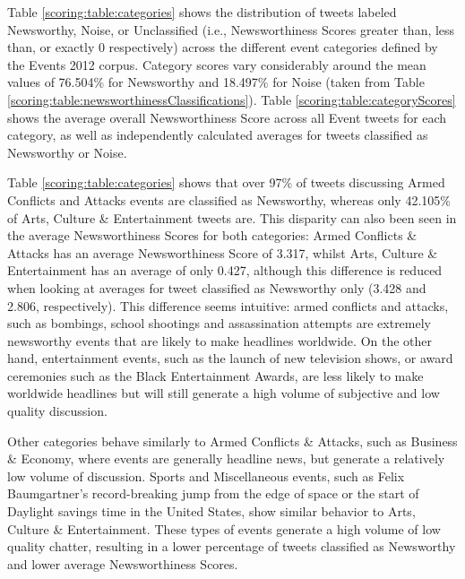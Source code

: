 Table \ref{scoring:table:categories} shows the distribution of tweets labeled Newsworthy,  Noise, or Unclassified (i.e., Newsworthiness Scores greater than, less than, or exactly 0 respectively) across the different event categories defined by the Events 2012 corpus.
Category scores vary considerably around the mean values of 76.504\% for Newsworthy and 18.497\% for Noise (taken from Table \ref{scoring:table:newsworthinessClassifications}).
Table \ref{scoring:table:categoryScores} shows the average overall Newsworthiness Score across all Event tweets for each category, as well as independently calculated averages for tweets classified as Newsworthy or Noise.

Table \ref{scoring:table:categories} shows that over 97\% of tweets discussing Armed Conflicts and Attacks events are classified as Newsworthy, whereas only 42.105\% of Arts, Culture \& Entertainment tweets are.
This disparity can also been seen in the average Newsworthiness Scores for both categories: Armed Conflicts \& Attacks has an average Newsworthiness Score of 3.317, whilst Arts, Culture \& Entertainment has an average of only 0.427, although this difference is reduced when looking at averages for tweet classified as Newsworthy only (3.428 and 2.806, respectively).
This difference seems intuitive: armed conflicts and attacks, such as bombings, school shootings and assassination attempts are extremely newsworthy events that are likely to make headlines worldwide.
On the other hand, entertainment events, such as the launch of new television shows, or award ceremonies such as the Black Entertainment Awards, are less likely to make worldwide headlines but will still generate a high volume of subjective and low quality discussion.

Other categories behave similarly to Armed Conflicts \& Attacks, such as Business \& Economy, where events are generally headline news, but generate a relatively low volume of discussion.
Sports and Miscellaneous events, such as Felix Baumgartner's record-breaking jump from the edge of space or the start of Daylight savings time in the United States, show similar behavior to Arts, Culture \& Entertainment.
These types of events generate a high volume of low quality chatter, resulting in a lower percentage of tweets classified as Newsworthy and lower average Newsworthiness Scores.

